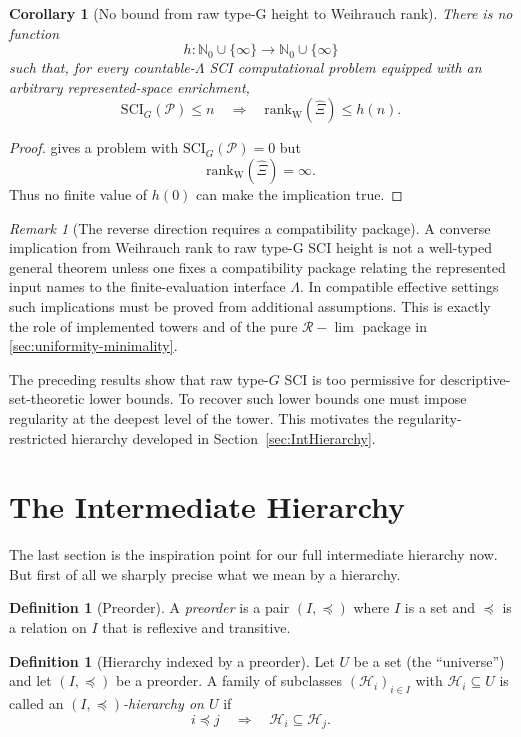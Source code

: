 \documentclass{lmcs} %
\theoremstyle{plain}
\theoremstyle{plain}
\newtheorem{corollary}[theorem]{Corollary}
\theoremstyle{definition}
\newtheorem{definition}[theorem]{Definition}
\theoremstyle{remark}
\newtheorem{remark}[theorem]{Remark}
\theoremstyle{definition}
\theoremstyle{remark}
\numberwithin{equation}{section}
\newcommand{\Lim}{\operatorname{lim}}
\newcommand{\SCIG}{\mathrm{SCI}_G}
\begin{document}
\begin{corollary}[No bound from raw type-G height to Weihrauch rank]\label{cor:no-bound-G-to-W}
There is no function
\[
        h:\mathbb N_0\cup\{\infty\}\to\mathbb N_0\cup\{\infty\}
\]
such that, for every countable-\(\Lambda\) SCI computational problem equipped with an arbitrary represented-space enrichment,
\[
        \SCIG(\mathcal P)\le n \quad\Longrightarrow\quad \mathrm{rank}_{\mathrm W} (\widehat{\Xi})\le h(n).
\]
\end{corollary}

\begin{proof}
 gives a problem with $\SCIG(\mathcal P)=0$ but
\[
        \mathrm{rank}_{\mathrm W} (\widehat{\Xi})=\infty.
\]
Thus no finite value of \(h(0)\) can make the implication true.
\end{proof}

\begin{remark}[The reverse direction requires a compatibility package]
A converse implication from Weihrauch rank to raw type-G SCI height is not a well-typed general theorem unless one fixes a compatibility package relating the
represented input names to the finite-evaluation interface \(\Lambda\). In compatible effective settings such implications must be proved from additional assumptions. This
is exactly the role of implemented towers and of the pure $\mathcal R-\Lim$ package in \cref{sec:uniformity-minimality}.
\end{remark}

The preceding results show that raw type-\(G\) SCI is too permissive for
descriptive-set-theoretic lower bounds. To recover such lower bounds one must impose
regularity at the deepest level of the tower. This motivates the regularity-restricted
hierarchy developed in Section~\ref{sec:IntHierarchy}.

\section{The Intermediate Hierarchy}{\label{sec:IntHierarchy}}
The last section is the inspiration point for our full intermediate hierarchy now. But first of all we sharply precise what we mean by a hierarchy.
\begin{definition}[Preorder]
A \textit{preorder} is a pair $(I,\preceq)$ where $I$ is a set and $\preceq$ is a relation on $I$
that is reflexive and transitive.
\end{definition}

\begin{definition}[Hierarchy indexed by a preorder]\label{def:hierarchy}
Let $U$ be a set (the \enquote{universe}) and let $(I,\preceq)$ be a preorder.
A family of subclasses $(\mathcal{H}_i)_{i\in I}$ with $\mathcal{H}_i\subseteq U$ is called an
\textit{$(I,\preceq)$-hierarchy on $U$} if
\[
i\preceq j \quad\Longrightarrow\quad \mathcal{H}_i \subseteq \mathcal{H}_j.
\]
\end{definition}
\end{document}

